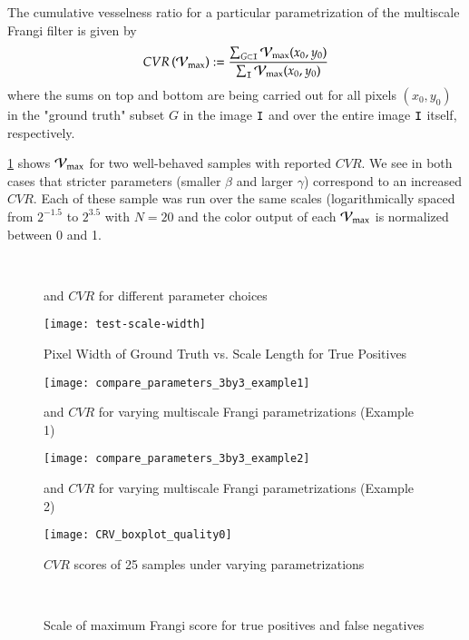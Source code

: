 \begin{defn} The cumulative vesselness ratio for a particular parametrization of the multiscale Frangi filter is given by
	\begin{equation}
	CVR\left(\mathcal{V}_{\max}\right) := \frac{\sum_{G\subset\mathtt{I}} \mathcal{V}_{\max}(x_0, y_0)}{\sum_{\mathtt{I}} \mathcal{V}_{\max}(x_0,y_0)}
	\end{equation}
	where the sums on top and bottom are being carried out for all pixels $(x_0,y_0)$ in the "ground truth" subset $G$ in the image $\mathtt{I}$
	and over the entire image $\mathtt{I}$ itself, respectively.
\end{defn}

\cref{fig:compare_parameters} shows $\mathcal{V}_{\max}$ for two well-behaved samples with reported $CVR$. We see in both cases that stricter parameters (smaller $\beta$ and larger $\gamma$) correspond to an increased $CVR$. Each of these sample was run over the same scales (logarithmically spaced from $2^{-1.5}$ to $2^{3.5}$ with $N=20$ and the color output of each $\mathcal{V}_{\max}$ is normalized between 0 and 1.

\begin{figure}[p]\centering
	\\
	\caption{\Vmax  and $CVR$ for different parameter choices}
	\label{fig:compare_parameters}
\end{figure}

\begin{figure}[p]
  \texttt{[image: test-scale-width]}
  \caption{Pixel Width of Ground Truth vs. Scale Length for True Positives}
\end{figure}

\begin{figure}[p]\centering
		\texttt{[image: compare\_parameters\_3by3\_example1]}
	\caption{\Vmax  and $CVR$ for varying multiscale Frangi parametrizations (Example 1)}
	\label{fig:compare_parameters_3by3_example1}
\end{figure}

\begin{figure}[p]\centering
	\texttt{[image: compare\_parameters\_3by3\_example2]}
	\caption{\Vmax  and $CVR$ for varying multiscale Frangi parametrizations (Example 2)}
	\label{fig:compare_parameters_3by3_example2}
\end{figure}

\begin{figure}\centering
	\texttt{[image: CRV\_boxplot\_quality0]}
	\caption{$CVR$ scores of 25 samples under varying parametrizations}
\end{figure}
\begin{figure}[p]\centering
  \\[-0.5cm]
  \caption{Scale of maximum Frangi score for true positives and false negatives}
\end{figure}


